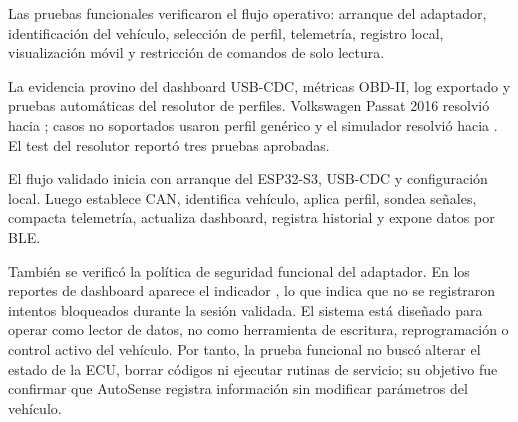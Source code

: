 \documentclass[12pt,letterpaper]{report}
\begin{document}
Las pruebas funcionales verificaron el flujo operativo: arranque del adaptador, identificación del vehículo, selección de perfil, telemetría, registro local, visualización móvil y restricción de comandos de solo lectura.

La evidencia provino del dashboard USB-CDC, métricas OBD-II, log exportado y pruebas automáticas del resolutor de perfiles. Volkswagen Passat 2016 resolvió hacia ; casos no soportados usaron perfil genérico y el simulador resolvió hacia . El test del resolutor reportó tres pruebas aprobadas.

El flujo validado inicia con arranque del ESP32-S3, USB-CDC y configuración local. Luego establece CAN, identifica vehículo, aplica perfil, sondea señales, compacta telemetría, actualiza dashboard, registra historial y expone datos por BLE.

También se verificó la política de seguridad funcional del adaptador. En los reportes de dashboard aparece el indicador , lo que indica que no se registraron intentos bloqueados durante la sesión validada. El sistema está diseñado para operar como lector de datos, no como herramienta de escritura, reprogramación o control activo del vehículo. Por tanto, la prueba funcional no buscó alterar el estado de la ECU, borrar códigos ni ejecutar rutinas de servicio; su objetivo fue confirmar que AutoSense registra información sin modificar parámetros del vehículo.
\end{document}
